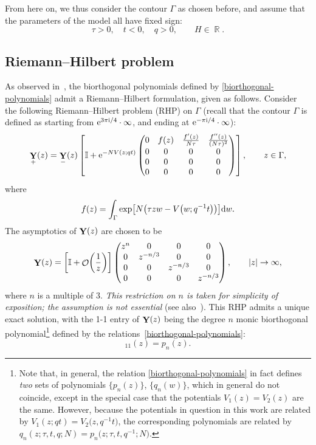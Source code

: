 \documentclass[pdftex]{sigma}
\DeclareMathOperator{\RR}{\mathbb{R}}
\DeclareMathOperator{\OO}{\mathcal{O}}
\DeclareMathOperator{\YY}{{\bf Y}}
\numberwithin{equation}{section}
\begin{document}
From here on, we thus consider the contour $\Gamma$ as chosen before, and assume that the parameters of the model all have fixed sign:
 \begin{equation*}
 \tau >0,\quad t < 0, \quad q >0, \qquad H\in \RR.
 \end{equation*}

\subsection{Riemann--Hilbert problem}

As observed in~\cite{KM}, the biorthogonal polynomials defined by \eqref{biorthogonal-polynomials} admit a Riemann--Hilbert formulation, given as follows.
Consider the following Riemann--Hilbert problem (RHP) on $\Gamma$ (recall that the contour $\Gamma$ is defined as starting from
${\rm e}^{3\pi {\rm i}/4}\cdot \infty$, and ending at ${\rm e}^{-\pi {\rm i}/4}\cdot\infty$):
 \begin{equation*} %
 \YY_{+}(z) = \YY_{-}(z) \left[\mathbb{I} + {\rm e}^{-NV(z;q t)}\begin{pmatrix}
 0 & f(z) & \frac{f'(z)}{N\tau} & \frac{f''(z)}{(N\tau)^2} \\
 0 & 0 & 0 & 0 \\
 0 & 0 & 0 & 0 \\
 0 & 0 & 0 & 0
 \end{pmatrix} \right]
, \qquad z \in \Gamma,
 \end{equation*}
where
 \begin{equation*}
 f(z) = \int_{\Gamma} \exp\bigl[ N\bigl(\tau z w - V\bigl(w;q^{-1}t\bigr) \bigr)\bigr] {\rm d}w.
 \end{equation*}
The asymptotics of $\YY(z)$ are chosen to be
 \begin{equation*}
 \YY(z) = \biggl[ \mathbb{I} + \OO\biggl(\frac{1}{z}\biggr) \biggr]
 \begin{pmatrix}
 z^n & 0 & 0 & 0 \\
 0 & z^{-n/3} & 0 & 0 \\
 0 & 0 & z^{-n/3} & 0 \\
 0 & 0 & 0 & z^{-n/3}
 \end{pmatrix}, \qquad |z| \to \infty,
 \end{equation*}
where $n$ is a multiple of $3$. \emph{This restriction on $n$ is taken for simplicity of exposition; the assumption is not essential} (see also~\cite{DK1,DKM}). This RHP admits a unique exact solution, with the 1-1 entry of $\YY(z)$ being the degree $n$ monic biorthogonal polynomial\footnote{Note that, in general, the relation \eqref{biorthogonal-polynomials} in fact defines \textit{two} sets of polynomials $\{p_n(z)\}$, $\{q_n(w)\}$, which in general do not coincide, except in the special case that the potentials $V_ 1(z) = V_2(z)$ are the same. However, because the potentials in question in this work are related by $V_1(z;qt) = V_2\bigl(z,q^{-1}t\bigr)$, the corresponding polynomials are related by $q_n(z;\tau,t,q;N) = p_n\bigl(z;\tau,t,q^{-1};N\bigr)$. } defined by the relations~\eqref{biorthogonal-polynomials}:
 \begin{equation*}
 [\YY]_{11}(z) = p_n(z).
 \end{equation*}
\end{document}
